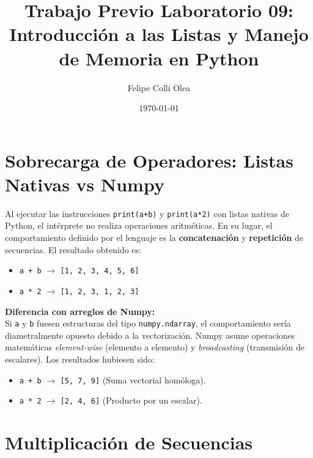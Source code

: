 \documentclass[11pt]{article}
\title{Trabajo Previo Laboratorio 09: \\ \large{Introducción a las Listas y Manejo de Memoria en Python}}
\author{Felipe Colli Olea}
\date{\today}
\begin{document}
\maketitle
\thispagestyle{fancy}

\section{Sobrecarga de Operadores: Listas Nativas vs Numpy}

Al ejecutar las instrucciones \texttt{print(a+b)} y \texttt{print(a*2)} con listas nativas de Python, el intérprete no realiza operaciones aritméticas. En su lugar, el comportamiento definido por el lenguaje es la \textbf{concatenación} y \textbf{repetición} de secuencias. El resultado obtenido es:
\begin{itemize}
    \item \texttt{a + b} $\rightarrow$ \texttt{[1, 2, 3, 4, 5, 6]}
    \item \texttt{a * 2} $\rightarrow$ \texttt{[1, 2, 3, 1, 2, 3]}
\end{itemize}

\textbf{Diferencia con arreglos de Numpy:} \\
Si \texttt{a} y \texttt{b} fuesen estructuras del tipo \texttt{numpy.ndarray}, el comportamiento sería diametralmente opuesto debido a la vectorización. Numpy asume operaciones matemáticas \textit{element-wise} (elemento a elemento) y \textit{broadcasting} (transmisión de escalares). Los resultados hubiesen sido:
\begin{itemize}
    \item \texttt{a + b} $\rightarrow$ \texttt{[5, 7, 9]} (Suma vectorial homóloga).
    \item \texttt{a * 2} $\rightarrow$ \texttt{[2, 4, 6]} (Producto por un escalar).
\end{itemize}

\section{Multiplicación de Secuencias}
\end{document}
